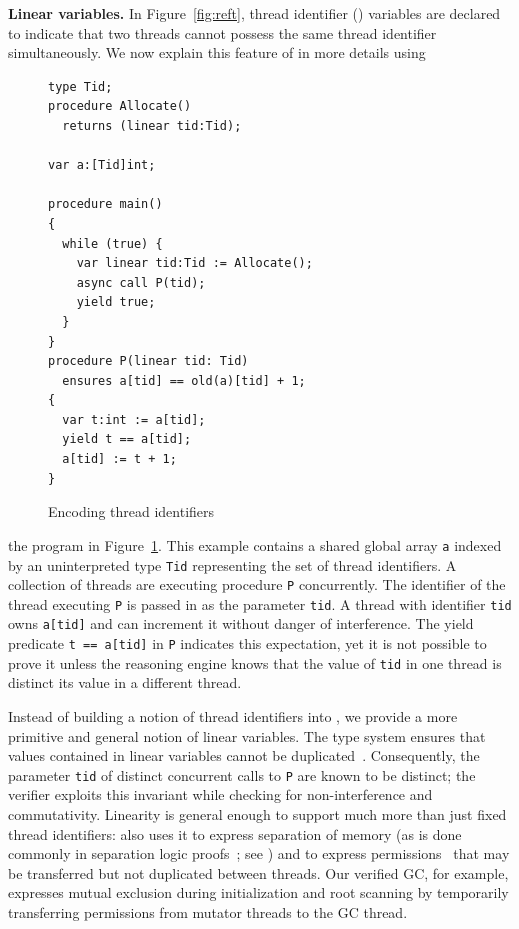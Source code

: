 {\bf Linear variables.}
In Figure~\ref{fig:reft}, thread identifier () variables are declared  
to indicate that two threads cannot possess the same thread identifier simultaneously.
We now explain this feature of \civl in more details using 
\begin{figure}
\vspace*{-1cm}
{\scriptsize
\begin{verbatim}
type Tid;
procedure Allocate() 
  returns (linear tid:Tid);

var a:[Tid]int;

procedure main()
{
  while (true) {
    var linear tid:Tid := Allocate();
    async call P(tid);
    yield true;
  }
}
procedure P(linear tid: Tid)
  ensures a[tid] == old(a)[tid] + 1;
{
  var t:int := a[tid];
  yield t == a[tid];
  a[tid] := t + 1;
}
\end{verbatim}
}
\vspace*{-0.3cm}
 \caption{Encoding thread identifiers}
\label{fig:ex5}
\end{figure}
the program in Figure~\ref{fig:ex5}.
This example contains a shared global array {\tt a} indexed by an uninterpreted type {\tt Tid} 
representing the set of thread identifiers.
A collection of threads are executing procedure {\tt P} concurrently.
The identifier of the thread executing {\tt P} is passed in as the parameter {\tt tid}.
A thread with identifier {\tt tid} owns {\tt a[tid]} and can increment it without danger of interference.
The yield predicate {\tt t == a[tid]} in {\tt P} indicates this expectation, yet it is not possible to prove it 
unless the reasoning engine knows that the value of {\tt tid} in one thread is distinct 
its value in a different thread.

Instead of building a notion of thread identifiers into \civl, we provide a more 
primitive and general notion of linear variables.
The \civl type system ensures that values contained in linear variables cannot be duplicated~\cite{Wadler90lineartypes}.
Consequently, the parameter {\tt tid} of distinct concurrent calls to {\tt P} are known to be distinct;
the \civl verifier exploits this invariant while checking for non-interference and commutativity.
Linearity is general enough to support much more than just fixed thread identifiers:
\civl also uses it to express separation of memory (as is done
commonly in separation logic proofs~\cite{Reynolds02}; see \cite{LahiriQW11})
and to express permissions~\cite{boyland:03fractions} that may be transferred but not duplicated between threads.
Our verified GC, for example, expresses mutual exclusion during initialization and root scanning by temporarily transferring permissions from mutator threads to the GC thread.

